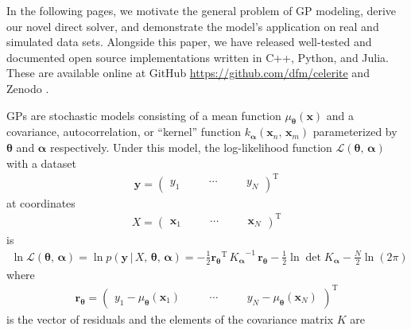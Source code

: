 \documentclass[manuscript, letterpaper]{aastex6}
\makeatletter
\let\origsection\section
\renewcommand\section{\@ifstar{\starsection}{\nostarsection}}
\newcommand\nostarsection[1]{\sectionprelude\origsection{#1}}
\newcommand\starsection[1]{\sectionprelude\origsection*{#1}}
\newcommand\sectionprelude{\vspace{1em}}
\newcommand{\project}[1]{\textsf{#1}}
\newcommand{\eqlabel}[1]{\label{eq:#1}}
\newcommand{\sectlabel}[1]{\label{sect:#1}}
\newcommand{\T}{\ensuremath{\mathrm{T}}}
\newcommand{\bvec}[1]{{\ensuremath{\boldsymbol{#1}}}}
\newcommand{\response}[1]{{\color{blue}#1}}
\makeatother
\begin{document}
In the following pages, we motivate the general problem of GP modeling, derive
our novel direct solver, and demonstrate the model's application on real and
simulated data sets.
Alongside this paper, we have released well-tested and documented open source
implementations written in \project{C++}, \project{Python}, and
\project{Julia}.
These are available online at \project{GitHub}
\url{https://github.com/dfm/celerite} and \project{Zenodo}
\citep{Foreman-Mackey:2017}.

\section{Gaussian processes}\sectlabel{gps}

GPs are stochastic models consisting of a mean function
$\mu_\bvec{\theta}(\bvec{x})$ and a covariance, autocorrelation, or ``kernel''
function $k_\bvec{\alpha}(\bvec{x}_n,\,\bvec{x}_m)$ parameterized by
$\bvec{\theta}$ and $\bvec{\alpha}$ respectively.
Under this model, \response{the log-likelihood function $\mathcal{L}
(\bvec{\theta},\,\bvec{\alpha})$} with a dataset
\begin{eqnarray}
\bvec{y} = \left(\begin{array}{ccccc}
    y_1\quad && \cdots\quad && y_N
\end{array}\right)^\T
\end{eqnarray}
at coordinates
\begin{eqnarray}
X = \left(\begin{array}{ccccc}
    \bvec{x}_1\quad && \cdots\quad && \bvec{x}_N
\end{array}\right)^\T
\end{eqnarray}
is
\begin{eqnarray}\eqlabel{gp-likelihood}
\ln \mathcal{L} (\bvec{\theta},\,\bvec{\alpha}) =
\ln{p(\bvec{y}\,|\,{X,\,\bvec{\theta}},\,\bvec{\alpha})} =
    -\frac{1}{2} {\bvec{r}_\bvec{\theta}}^\T\,{K_\bvec{\alpha}}^{-1}\,
        \bvec{r}_\bvec{\theta}
    -\frac{1}{2}\ln\det K_\bvec{\alpha}
    - \frac{N}{2} \ln{(2\pi)}
\end{eqnarray}
where
\begin{eqnarray}
    \bvec{r}_\bvec{\theta} = \left(\begin{array}{ccccc}
    y_1 - \mu_\bvec{\theta}(\bvec{x}_1)\quad && \cdots\quad &&
    y_N - \mu_\bvec{\theta}(\bvec{x}_N)
\end{array}\right)^\T
\end{eqnarray}
is the vector of residuals and the elements of the covariance matrix $K$ are
\end{document}
